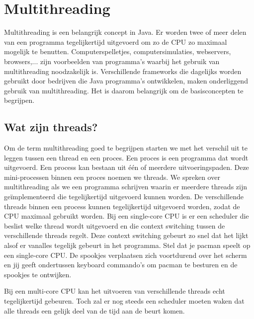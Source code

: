 \documentclass{tstextbook}
\begin{document}
\chapter{Multithreading}

\begin{summary}
Multithreading is een belangrijk concept in Java. Er worden twee of meer delen van een programma tegelijkertijd uitgevoerd om zo de CPU zo maximaal mogelijk te benutten.
Computerspelletjes, computersimulaties, webservers, browsers,... zijn voorbeelden van programma's waarbij het gebruik van multithreading noodzakelijk is. Verschillende frameworks die dagelijks worden gebruikt door bedrijven die Java programma's ontwikkelen, maken onderliggend gebruik van multithreading. Het is daarom belangrijk om de basisconcepten te begrijpen.
\end{summary}

\section{Wat zijn threads?}

Om de term multithreading goed te begrijpen starten we met het verschil uit te leggen tussen een thread en een proces. Een proces is een programma dat wordt uitgevoerd.
Een process kan bestaan uit \'e\'en of meerdere uitvoeringspaden. Deze mini-processen binnen een proces noemen we threads. We spreken over multithreading als we een programma schrijven waarin er meerdere threads zijn ge\"implementeerd die tegelijkertijd uitgevoerd kunnen worden. 
De verschillende threads binnen een process kunnen tegelijkertijd uitgevoerd worden, zodat de CPU maximaal gebruikt worden. 
Bij een single-core CPU is er een scheduler die beslist welke thread wordt uitgevoerd en die context switching tussen de verschillende threads regelt. Deze context switching gebeurt zo snel dat het lijkt alsof er vanalles tegelijk gebeurt in het programma. Stel dat je pacman speelt op een single-core CPU. De spookjes verplaatsen zich voortdurend over het scherm en jij geeft ondertussen keyboard commando's om pacman te besturen en de spookjes te ontwijken.

Bij een multi-core CPU kan het uitvoeren van verschillende threads echt tegelijkertijd gebeuren. Toch zal er nog steeds een scheduler moeten waken dat alle threads een gelijk deel van de tijd aan de beurt komen.  
\end{document}
